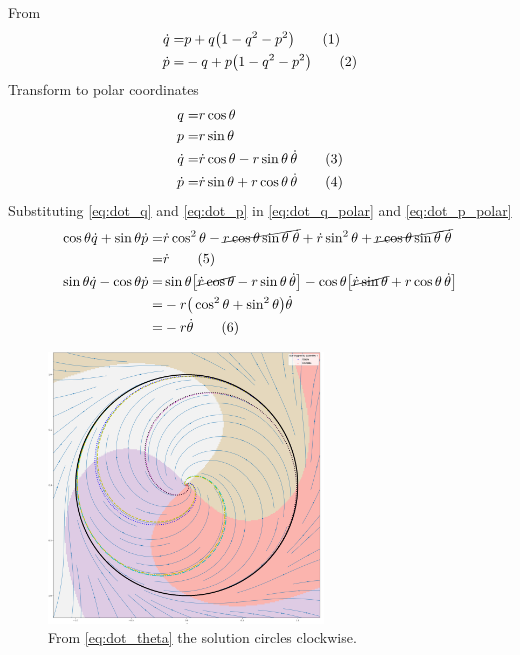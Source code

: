 \documentclass[]{article}
\newcommand\numberthis{\addtocounter{equation}{1}\tag{\theequation}}
\begin{document}
From \cite[Q1.3]{ChaosBook}
\begin{align*}
	\dot{q} =& p + q\big(1-q^2-p^2\big) \numberthis \label{eq:dot_q}\\
	\dot{p} =&-q + p\big(1-q^2-p^2\big) \numberthis \label{eq:dot_p}
\end{align*}
Transform to polar coordinates
\begin{align*}
	q =& r \cos{\theta}\\
	p =& r \sin{\theta}\\
	\dot{q} =& \dot{r} \cos{\theta}  - r \sin{\theta} \, \dot{\theta} \numberthis \label{eq:dot_q_polar}\\
	\dot{p} =& \dot{r} \sin{\theta}  + r \cos{\theta} \, \dot{\theta} \numberthis \label{eq:dot_p_polar}
\end{align*}
Substituting \eqref{eq:dot_q} and \eqref{eq:dot_p} in \eqref{eq:dot_q_polar} and \eqref{eq:dot_p_polar}
\begin{align*}
	\cos{\theta} \dot{q} + \sin{\theta} \dot{p} =& \dot{r}\cos^2\theta -\cancel{r \cos{\theta} \sin{\theta}\; \dot{\theta}} + \dot{r}\sin^2\theta+ \cancel{r \cos{\theta} \sin{\theta}\; \dot{\theta}}\\
	=& \dot{r}  \numberthis \label{eq:dot_r0}\\
	\sin{\theta} \dot{q} - \cos{\theta}\dot{p} =& \sin{\theta} \big[\cancel{\dot{r} \cos{\theta}}  - r \sin{\theta} \, \dot{\theta}\big] - \cos{\theta}\big[\cancel{\dot{r} \sin{\theta}}  + r \cos{\theta} \, \dot{\theta}\big]\\
	=& - r \big(\cos^2\theta+\sin^2\theta\big) \dot{\theta}\\
	=&-r \dot{\theta} \numberthis \label{eq:dot_theta}
\end{align*}
\begin{figure}[H]
	\begin{center}
		\caption{From \eqref{eq:dot_theta} the solution circles clockwise.}
		\includegraphics[width=0.65\textwidth]{wk2/floquet.png}
	\end{center}
\end{figure}
\end{document}
